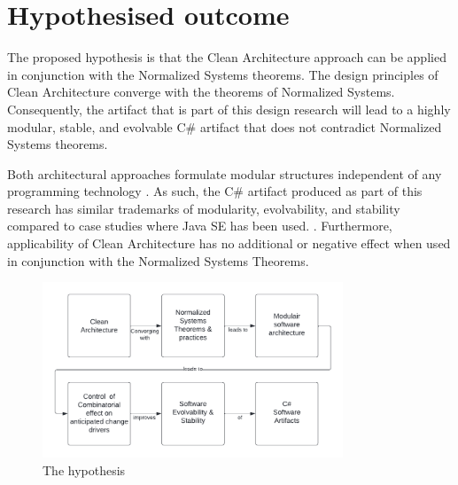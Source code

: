 \section{Hypothesised outcome} \label{hypothesis} 

The proposed hypothesis is that the Clean Architecture approach can be applied in
conjunction with the Normalized Systems theorems. The design principles of Clean
Architecture converge with the theorems of Normalized Systems. Consequently, the artifact
that is part of this design research will lead to a highly modular, stable, and evolvable
C\# artifact that does not contradict Normalized Systems theorems.

Both architectural approaches formulate modular structures independent of any programming
technology \parencite{mannaert_normalized_2009,robert_c_martin_clean_2018}. As such, the
C\# artifact produced as part of this research has similar trademarks of modularity,
evolvability, and stability compared to case studies where Java SE has been used.
\parencite{oorts_building_2014, de_bruyn_enabling_2018}. Furthermore, applicability of
Clean Architecture has no additional or negative effect when used in conjunction with the
Normalized Systems Theorems.

\begin{figure}[H]
    \centering
    \includegraphics[width=0.8\textwidth]{Figures/hypothesis.pdf}
    \caption[The hypothesis]{The hypothesis}
    \label{fig_hypothesis}
\end{figure}